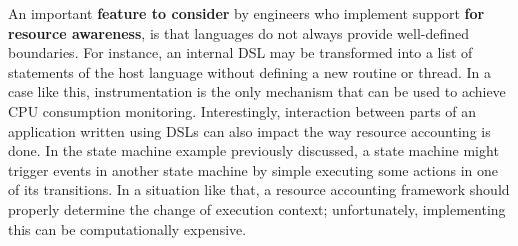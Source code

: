 An important \textbf{feature to consider} by engineers who implement support \textbf{for resource awareness},
is that languages do not always provide well-defined boundaries.
For instance, an internal DSL may be transformed into a list of statements of the host language without defining a new routine or thread.
In a case like this, instrumentation is the only mechanism that can be used to achieve CPU consumption monitoring.
Interestingly, interaction between parts of an application written using DSLs can also impact the way resource accounting is done.
In the state machine example previously discussed, a state machine might trigger events in another state machine by simple executing some actions in one of its transitions.
In a situation like that, a resource accounting framework should properly determine the change of execution context; unfortunately, implementing this can be computationally expensive. 




%
%
%


